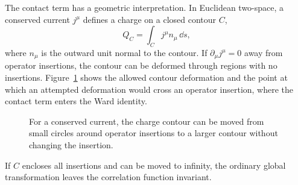 The contact term has a geometric interpretation.  In Euclidean two-space, a
conserved current \(j^\mu\) defines a charge on a closed contour \(C\),
\[
  Q_C=\int_C j^\mu n_\mu\,\dd s ,
\]
where \(n_\mu\) is the outward unit normal to the contour.  If
\(\partial_\mu j^\mu=0\) away from operator insertions, the contour can be
deformed through regions with no insertions.
Figure~\ref{fig:conserved-contour-charge-deformation} shows the allowed
contour deformation and the point at which an attempted deformation would cross
an operator insertion, where the contact term enters the Ward identity.
\begin{figure}[H]
  \centering
  \caption{For a conserved current, the charge contour can be moved from small
  circles around operator insertions to a larger contour without changing the
  insertion.}
  \label{fig:conserved-contour-charge-deformation}
\end{figure}
If \(C\) encloses all insertions and can be moved to infinity, the ordinary
global transformation leaves the correlation function invariant.

